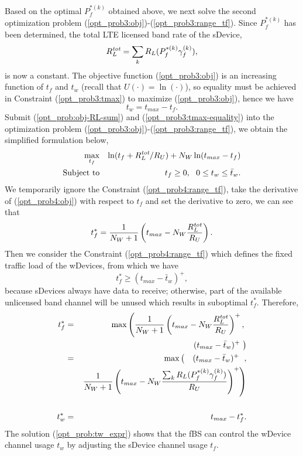 \documentclass[journal,final,letterpaper,10pt,doublecolumn,twoside]{IEEEtran}
\begin{document}
Based on the optimal $P_f^{*(k)}$ obtained above, we next solve the second optimization problem (\ref{opt_prob3:obj})-(\ref{opt_prob3:range_tf}).  Since $P_f^{*(k)}$ has been determined, the total LTE licensed band rate of the sDevice,
\begin{equation}
R^{\emph{tot}}_L = \sum_k R_L(P_f^{*(k)} \gamma_f^{(k)}),
\label{opt_prob:obj-RL-sum}
\end{equation}
is now a constant. The objective function (\ref{opt_prob3:obj}) is an increasing function of $t_f$ and $t_w$ (recall that $U(\cdot) = \ln(\cdot)$), so equality must be achieved in Constraint (\ref{opt_prob3:tmax}) to maximize (\ref{opt_prob3:obj}), hence we have
\begin{equation}
t_w=t_{max} - t_f. \label{opt_prob3:tmax-equality}
\end{equation}
Submit (\ref{opt_prob:obj-RL-sum}) and (\ref{opt_prob3:tmax-equality}) into the optimization problem (\ref{opt_prob3:obj})-(\ref{opt_prob3:range_tf}), we obtain the simplified formulation below,
\begin{eqnarray}
\max_{t_f} && \ln ( t_f + R^{\emph{tot}}_L / R_U )  +  N_W \ln(t_{max} - t_f ) \label{opt_prob4:obj} \\
\textmd{Subject to}
&& t_f \geq 0, ~~ 0 \leq t_w \leq \bar{t}_w  . \label{opt_prob4:range_tf}
\end{eqnarray}
We temporarily ignore the Constraint (\ref{opt_prob4:range_tf}), take the derivative of (\ref{opt_prob4:obj}) with respect to $t_f$ and set the derivative to zero, we can see that
\begin{equation}
t_f^* =  \frac{1}{N_W +1}  \left( t_{max} - N_W
\frac{R^{\emph{tot}}_L}{R_U}  \right).
\end{equation}
Then we consider the Constraint (\ref{opt_prob4:range_tf}) which defines the fixed traffic load of the wDevices, from which we have
\begin{equation}
t_f^* \geq   (t_{max} - \bar{t}_w)^+,
\end{equation}
because sDevices always have data to receive; otherwise,  part of the available unlicensed band channel will be unused which results in suboptimal $t_f^*$.
Therefore,
\begin{eqnarray}\nonumber
t_f^* &=& \max \left(  \frac{1}{N_W +1}  \left( t_{max} - N_W
\frac{R^{\emph{tot}}_L}{R_U}
   \right)^+ ,   \right. \\
&&\left.   ~~~~~~~~ (t_{max} - \bar{t}_w)^+   ~ \right)
\nonumber \\
 &=&  \max \left(   ~~~ (t_{max} - \bar{t}_w)^+   ~ \right. , \nonumber \\
&& \left.  \frac{1}{N_W +1}  \left( t_{max} - N_W
\frac{\sum_k R_L(P_f^{*(k)} \gamma_f^{(k)}) }{R_U}
   \right)^+    \right) \nonumber \\
   &&  \label{opt_prob:tf_expr} \\
t_w^*&=& t_{max} - t_f^* .  \label{opt_prob:tw_expr}
\end{eqnarray}
The solution (\ref{opt_prob:tw_expr}) shows that  the fBS can control the wDevice channel usage $t_w$ by adjusting the sDevice channel usage $t_f$.
\end{document}
